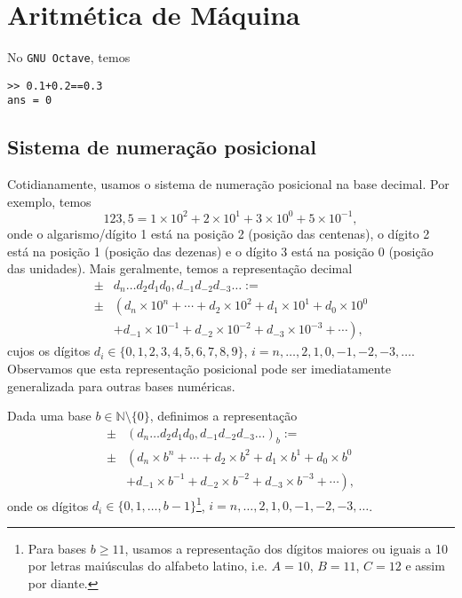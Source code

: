 
\chapter{Aritmética de Máquina}\label{cap_aritm}
\thispagestyle{fancy}

\ifisoctave
No \verb+GNU Octave+, temos
\begin{verbatim}
>> 0.1+0.2==0.3
ans = 0
\end{verbatim}
\fi

\section{Sistema de numeração posicional}\label{cap_aritm_sec_sisnumpos}

Cotidianamente, usamos o sistema de numeração posicional na base decimal. Por exemplo, temos
\begin{equation}
  123,5 = 1\times 10^2 + 2\times 10^1 + 3\times 10^0 + 5\times 10^{-1},
\end{equation}
onde o algarismo/dígito 1 está na posição 2 (posição das centenas), o dígito 2 está na posição 1 (posição das dezenas) e o dígito 3 está na posição 0 (posição das unidades). Mais geralmente, temos a representação decimal
\begin{align}
  \pm &d_n\ldots d_2d_1d_0,d_{-1}d_{-2}d_{-3}\ldots := \\
  \pm &\left(d_n\times 10^n + \cdots + d_2\times 10^2 + d_1\times 10^1 + d_0\times 10^0\right. \\
      &\left. + d_{-1}\times 10^{-1} + d_{-2}\times 10^{-2} + d_{-3}\times 10^{-3} + \cdots\right),
\end{align}
cujos os dígitos $d_i \in \{0, 1, 2, 3, 4, 5, 6, 7, 8, 9\}$, $i=n, \dotsc, 2, 1, 0, -1, -2, -3, \ldots$. Observamos que esta representação posicional pode ser imediatamente generalizada para outras bases numéricas.

\begin{defn}\label{defn:representacao_posicional}
  Dada uma base $b\in\mathbb{N}\setminus \{0\}$, definimos a representação
  \begin{align}
    \pm &(d_n\ldots d_2d_1d_0,d_{-1}d_{-2}d_{-3}\ldots)_{b} := \\
    \pm &\left(d_n\times b^n + \cdots + d_2\times b^2 + d_1\times b^1 + d_0\times b^0\right. \\
      &\left. + d_{-1}\times b^{-1} + d_{-2}\times b^{-2} + d_{-3}\times b^{-3} + \cdots\right),
  \end{align}
onde os dígitos $d_i\in\{0, 1, \dotsc, b-1\}$\footnote{Para bases $b\geq 11$, usamos a representação dos dígitos maiores ou iguais a 10 por letras maiúsculas do alfabeto latino, i.e. $A=10$, $B=11$, $C=12$ e assim por diante.}, $i=n, \dotsc, 2, 1, 0, -1, -2, -3, \ldots$.
\end{defn}

